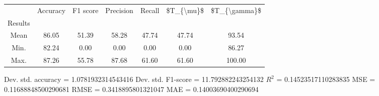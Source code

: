 \begin{tabular}{|c|c|c|c|c|c|c|}
\toprule
{} &  Accuracy &  F1 score &  Precision &  Recall &  \$T\_\{\textbackslash mu\}\$ &  \$T\_\{\textbackslash gamma\}\$ \\
Results &           &           &            &         &            &               \\
\hline
Mean    &     86.05 &     51.39 &      58.28 &   47.74 &      47.74 &         93.54 \\
Min.    &     82.24 &      0.00 &       0.00 &    0.00 &       0.00 &         86.27 \\
Max.    &     87.26 &     55.78 &      87.68 &   61.60 &      61.60 &        100.00 \\
\bottomrule
\end{tabular}

 Dev. std. accuracy = 1.0781932314543416
 Dev. std. F1-score = 11.792882243254132
 $R^2$ = 0.14523517110283835
 MSE = 0.11688848500290681
 RMSE = 0.3418895801321047
 MAE = 0.14003690400290694